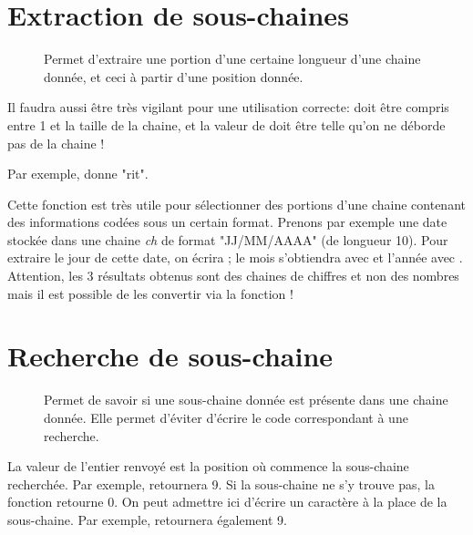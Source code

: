\section{Extraction de sous-chaines}

	\begin{description}
	\item[]
		Permet d'extraire une portion 
		d'une certaine longueur d'une chaine donnée, 
		et ceci à partir d'une position donnée. 
	\end{description}

	Il faudra aussi être très vigilant 
	pour une utilisation correcte: 
	 doit être compris entre 1 et la taille de la chaine, 
	et la valeur de  doit être telle 
	qu'on ne déborde pas de la chaine ! 

	Par exemple,  
	donne "rit".

	Cette fonction est très utile pour sélectionner 
	des portions d'une chaine 
	contenant des informations codées sous un certain format. 
	Prenons par exemple une date stockée dans une chaine \textit{ch} de format 
	"JJ/MM/AAAA" (de longueur 10). 
	Pour extraire le jour de cette date, 
	on écrira  ; 
	le mois s'obtiendra avec  
	et l'année avec . 
	Attention, les 3 résultats obtenus sont des chaines de chiffres 
	et non des nombres mais il est possible de les convertir
	via la fonction  !

\section{Recherche de sous-chaine}
	
	\begin{description}
	\item[]	
		Permet de savoir 
		si une sous-chaine donnée 
		est présente dans une chaine donnée. 
		Elle permet d'éviter d'écrire 
		le code correspondant à une recherche. 
	\end{description}
	
	La valeur de l'entier renvoyé est la position 
	où commence la sous-chaine recherchée. 
	Par exemple, 
	 retournera 9. 
	Si la sous-chaine ne s'y trouve pas, 
	la fonction retourne 0. 
	On peut admettre ici d'écrire un caractère à la place de la sous-chaine. 
	Par exemple, 
	 retournera également 9. 

